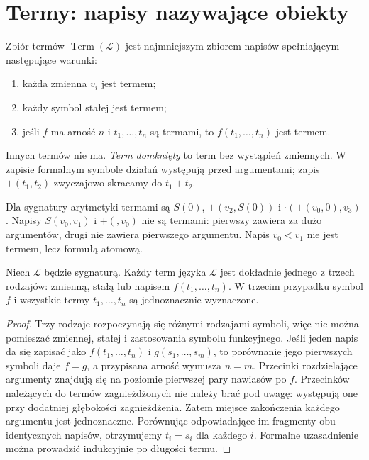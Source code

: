 \section{Termy: napisy nazywające obiekty}
\begin{definicja}[Term]\label{def:syntax-term}
Zbiór termów $\operatorname{Term}(\mathcal L)$ jest najmniejszym zbiorem
napisów spełniającym następujące warunki:
\begin{enumerate}[label=(\roman*)]
\item każda zmienna $v_i$ jest termem;
\item każdy symbol stałej jest termem;
\item jeśli $f$ ma arność $n$ i $t_1,\ldots,t_n$ są termami,
      to $f(t_1,\ldots,t_n)$ jest termem.
\end{enumerate}
Innych termów nie ma. \emph{Term domknięty} to term bez wystąpień zmiennych.
W zapisie formalnym symbole działań występują przed argumentami; zapis
$+(t_1,t_2)$ zwyczajowo skracamy do $t_1+t_2$.
\end{definicja}
\begin{przyklad}
Dla sygnatury arytmetyki termami są $S(0)$, $+(v_2,S(0))$
i $\cdot(+(v_0,0),v_3)$. Napisy $S(v_0,v_1)$ i $+(,v_0)$
nie są termami: pierwszy zawiera za dużo argumentów, drugi nie zawiera
pierwszego argumentu. Napis $v_0<v_1$ nie jest termem, lecz formułą atomową.
\end{przyklad}

\begin{lemat}\label{lem:syntax-unique-terms}
Niech $\mathcal L$ będzie sygnaturą. Każdy term języka $\mathcal L$ jest dokładnie jednego z trzech rodzajów:
zmienną, stałą lub napisem $f(t_1,\ldots,t_n)$.
W trzecim przypadku symbol $f$ i wszystkie termy $t_1,\ldots,t_n$
są jednoznacznie wyznaczone.
\end{lemat}
\begin{proof}
Trzy rodzaje rozpoczynają się różnymi rodzajami symboli, więc nie można
pomieszać zmiennej, stałej i zastosowania symbolu funkcyjnego.
Jeśli jeden napis da się zapisać jako $f(t_1,\ldots,t_n)$ i
$g(s_1,\ldots,s_m)$, to porównanie jego pierwszych symboli daje $f=g$,
a przypisana arność wymusza $n=m$.
Przecinki rozdzielające argumenty znajdują się na poziomie pierwszej pary
nawiasów po $f$. Przecinków należących do termów zagnieżdżonych nie należy
brać pod uwagę: występują one przy dodatniej głębokości zagnieżdżenia.
Zatem miejsce zakończenia każdego argumentu jest jednoznaczne.
Porównując odpowiadające im fragmenty obu identycznych napisów, otrzymujemy
$t_i=s_i$ dla każdego $i$. Formalne uzasadnienie można prowadzić
indukcyjnie po długości termu.
\end{proof}

